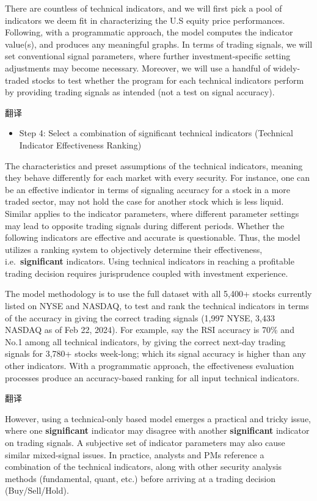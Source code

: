 \documentclass[
]{book}
\providecommand{\tightlist}{%
  \setlength{\itemsep}{0pt}\setlength{\parskip}{0pt}}
\begin{document}
There are countless of technical indicators, and we will first pick a
pool of indicators we deem fit in characterizing the U.S equity price
performances. Following, with a programmatic approach, the model
computes the indicator value(s), and produces any meaningful graphs. In
terms of trading signals, we will set conventional signal parameters,
where further investment-specific setting adjustments may become
necessary. Moreover, we will use a handful of widely-traded stocks to
test whether the program for each technical indicators perform by
providing trading signals as intended (not a test on signal accuracy).

翻译

\begin{itemize}
\tightlist
\item
  Step 4: Select a combination of significant technical indicators
  (Technical Indicator Effectiveness Ranking)
\end{itemize}

The characteristics and preset assumptions of the technical indicators,
meaning they behave differently for each market with every security. For
instance, one can be an effective indicator in terms of signaling
accuracy for a stock in a more traded sector, may not hold the case for
another stock which is less liquid. Similar applies to the indicator
parameters, where different parameter settings may lead to opposite
trading signals during different periods. Whether the following
indicators are effective and accurate is questionable. Thus, the model
utilizes a ranking system to objectively determine their effectiveness,
i.e.~\textbf{significant} indicators. Using technical indicators in
reaching a profitable trading decision requires jurisprudence coupled
with investment experience.

The model methodology is to use the full dataset with all 5,400+ stocks
currently listed on NYSE and NASDAQ, to test and rank the technical
indicators in terms of the accuracy in giving the correct trading
signals (1,997 NYSE, 3,433 NASDAQ as of Feb 22, 2024). For example, say
the RSI accuracy is 70\% and No.1 among all technical indicators, by
giving the correct next-day trading signals for 3,780+ stocks week-long;
which its signal accuracy is higher than any other indicators. With a
programmatic approach, the effectiveness evaluation processes produce an
accuracy-based ranking for all input technical indicators.

翻译

However, using a technical-only based model emerges a practical and
tricky issue, where one \textbf{significant} indicator may disagree with
another \textbf{significant} indicator on trading signals. A subjective
set of indicator parameters may also cause similar mixed-signal issues.
In practice, analysts and PMs reference a combination of the technical
indicators, along with other security analysis methods (fundamental,
quant, etc.) before arriving at a trading decision (Buy/Sell/Hold).
\end{document}

